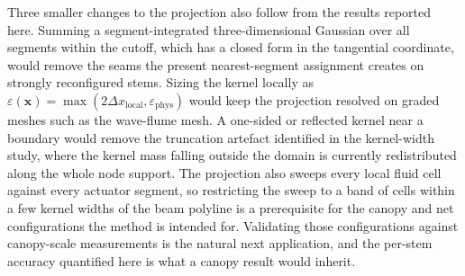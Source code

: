 \noindent
Three smaller changes to the projection also follow from the results reported here. Summing a segment-integrated three-dimensional Gaussian over all segments within the cutoff, which has a closed form in the tangential coordinate, would remove the seams the present nearest-segment assignment creates on strongly reconfigured stems. Sizing the kernel locally as $\varepsilon(\mathbf{x}) = \max(2\Delta x_{\mathrm{local}}, \varepsilon_{\mathrm{phys}})$ would keep the projection resolved on graded meshes such as the wave-flume mesh. A one-sided or reflected kernel near a boundary would remove the truncation artefact identified in the kernel-width study, where the kernel mass falling outside the domain is currently redistributed along the whole node support. The projection also sweeps every local fluid cell against every actuator segment, so restricting the sweep to a band of cells within a few kernel widths of the beam polyline is a prerequisite for the canopy and net configurations the method is intended for. Validating those configurations against canopy-scale measurements is the natural next application, and the per-stem accuracy quantified here is what a canopy result would inherit.
